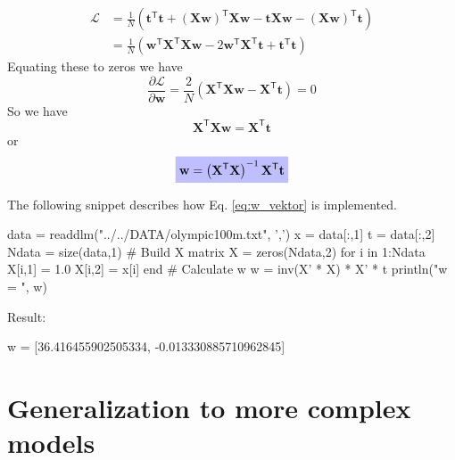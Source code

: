\documentclass[a4paper,11pt]{article} %
\newcommand{\highlighteq}[1]{\colorbox{blue!25}{$\displaystyle#1$}}
\begin{document}
\begin{align}
\mathcal{L} & = \frac{1}{N} \left(
\mathbf{t}^{\mathsf{T}} \mathbf{t} +
\left(\mathbf{Xw}\right)^{\mathsf{T}} \mathbf{Xw} -
\mathbf{t}\mathbf{Xw} -
\left(\mathbf{Xw}\right)^{\mathsf{T}} \mathbf{t}
\right) \\
& = \frac{1}{N} \left(
\mathbf{w}^{\mathsf{T}} \mathbf{X}^{\mathsf{T}} \mathbf{X} \mathbf{w} -
2 \mathbf{w}^{\mathsf{T}} \mathbf{X}^{\mathsf{T}}\mathbf{t} +
\mathbf{t}^{\mathsf{T}} \mathbf{t}
\right)
\end{align}
Equating these to zeros we have
\begin{equation}
\frac{\partial \mathcal{L}}{\partial \mathbf{w}} =
\frac{2}{N} \left( \mathbf{X}^{\mathsf{T}} \mathbf{Xw} - \mathbf{X}^{\mathsf{T}}\mathbf{t} \right) = 0
\end{equation}
So we have
\begin{equation}
\mathbf{X}^{\mathsf{T}} \mathbf{Xw} = \mathbf{X}^{\mathsf{T}} \mathbf{t}
\end{equation}
or
\begin{equation}
\highlighteq{
\mathbf{w} = \left(\mathbf{X}^{\mathsf{T}}\mathbf{X} \right)^{-1} \mathbf{X}^{\mathsf{T}} \mathbf{t}
}
\label{eq:w_vektor}
\end{equation}

The following snippet describes how Eq. \eqref{eq:w_vektor} is implemented.
\begin{juliacode}
data = readdlm("../../DATA/olympic100m.txt", ',')
x = data[:,1]
t = data[:,2]
Ndata = size(data,1)
# Build X matrix
X = zeros(Ndata,2)
for i in 1:Ndata
    X[i,1] = 1.0
    X[i,2] = x[i]
end
# Calculate w
w = inv(X' * X) * X' * t
println("w = ", w)
\end{juliacode}

Result:
\begin{textcode}
w = [36.416455902505334, -0.013330885710962845]
\end{textcode}


\section{Generalization to more complex models}
\end{document}
